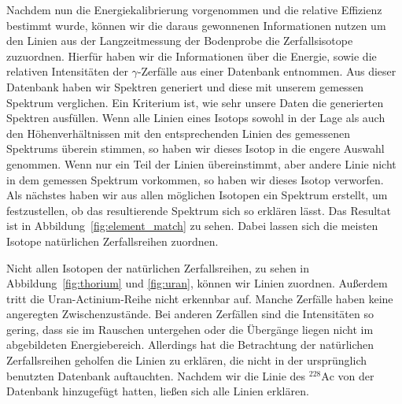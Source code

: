\documentclass[11pt, ngerman, fleqn, DIV=15, headinclude, BCOR=2cm]{scrreprt}
\begin{document}
Nachdem nun die Energiekalibrierung vorgenommen und die relative
Effizienz bestimmt wurde, können wir die daraus gewonnenen Informationen nutzen
um den Linien aus der Langzeitmessung der Bodenprobe die Zerfallsisotope
zuzuordnen.
Hierfür haben wir die Informationen über die Energie, sowie die relativen
Intensitäten der $\gamma$-Zerfälle aus einer Datenbank
\parencite{IAEA-gamma-ray-database} entnommen.
Aus dieser Datenbank haben wir Spektren generiert und diese mit unserem gemessen
Spektrum verglichen.
Ein Kriterium ist, wie sehr unsere Daten die generierten Spektren
ausfüllen. Wenn alle Linien eines Isotops sowohl in der Lage als auch den
Höhenverhältnissen
mit den entsprechenden Linien des gemessenen Spektrums überein stimmen, so haben
wir dieses Isotop in die engere Auswahl genommen. Wenn nur ein Teil der Linien
übereinstimmt, aber andere Linie nicht in dem gemessen Spektrum vorkommen, so
haben wir dieses Isotop verworfen.
Als nächstes haben wir aus allen möglichen Isotopen ein Spektrum erstellt, um
festzustellen, ob das resultierende Spektrum sich so erklären lässt.
Das Resultat ist in Abbildung~\ref{fig:element_match} zu sehen.
Dabei lassen sich die meisten Isotope natürlichen Zerfallsreihen zuordnen.


Nicht allen Isotopen der natürlichen Zerfallsreihen, zu sehen
in Abbildung~\ref{fig:thorium} und \ref{fig:uran}, können wir Linien 
zuordnen. 
Außerdem tritt die Uran-Actinium-Reihe nicht erkennbar auf.
Manche Zerfälle haben keine angeregten Zwischenzustände. Bei anderen
Zerfällen sind die
Intensitäten so gering, dass sie im Rauschen untergehen oder die Übergänge liegen
nicht im abgebildeten Energiebereich. Allerdings hat die Betrachtung der
natürlichen Zerfallsreihen geholfen die Linien zu erklären, die nicht in der
ursprünglich benutzten Datenbank auftauchten. Nachdem wir die Linie des
$^{228}\text{Ac}$ von \textcite{ac} der Datenbank hinzugefügt hatten, ließen sich alle Linien
erklären. 
\end{document}
